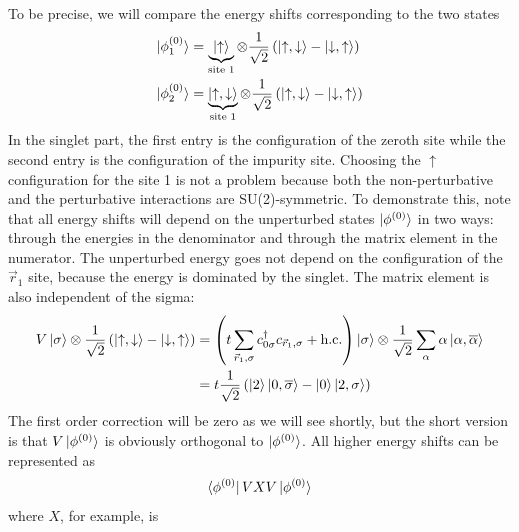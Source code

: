 \documentclass[twoside,11pt]{report}
\numberwithin{equation}{section}
\begin{document}
\\\\To be precise, we will compare the energy shifts corresponding to the two states
\begin{equation}\begin{aligned}
	\ket{\phi^{(0)}_1} &= \underbrace{\ket{\uparrow}}_\text{site 1}\otimes\frac{1}{\sqrt 2}\left(\ket{\uparrow, \downarrow} - \ket{\downarrow, \uparrow} \right) \\
	\ket{\phi^{(0)}_2} &= \underbrace{\ket{\uparrow, \downarrow}}_\text{site 1}\otimes\frac{1}{\sqrt 2}\left(\ket{\uparrow, \downarrow} - \ket{\downarrow, \uparrow} \right) 
\end{aligned}\end{equation}
In the singlet part, the first entry is the configuration of the zeroth site while the second entry is the configuration of the impurity site. Choosing the \(\uparrow\) configuration for the site 1 is not a problem because both the non-perturbative and the perturbative interactions are SU(2)-symmetric. To demonstrate this, note that all energy shifts will depend on the unperturbed states \(\ket{\phi^{(0)}}\) in two ways: through the energies in the denominator and through the matrix element in the numerator. The unperturbed energy goes not depend on the configuration of the \(\vec r_1\) site, because the energy is dominated by the singlet. The matrix element is also independent of the sigma:
\begin{equation}\begin{aligned}
	V\ket{\sigma}\otimes\frac{1}{\sqrt 2}\left(\ket{\uparrow, \downarrow} - \ket{\downarrow, \uparrow} \right) &= \left(t\sum_{\vec r_1,\sigma} c^\dagger_{0\sigma}c_{\vec r_1,\sigma} +\text{h.c.}\right) \ket{\sigma}\otimes\frac{1}{\sqrt 2}\sum_\alpha\alpha\ket{\alpha, \overline\alpha}\\
														   &=t\frac{1}{\sqrt 2}\left(\ket{2}\ket{0,\overline\sigma} - \ket{0}\ket{2,\sigma}\right)
\end{aligned}\end{equation}
The first order correction will be zero as we will see shortly, but the short version is that \(V\ket{\phi^{(0)}}\) is obviously orthogonal to \(\ket{\phi^{(0)}}\). All higher energy shifts can be represented as
\begin{equation}\begin{aligned}
	\bra{\phi^{(0)}} V X V \ket{\phi^{(0)}}
\end{aligned}\end{equation}
where \(X\), for example, is 
\end{document}
